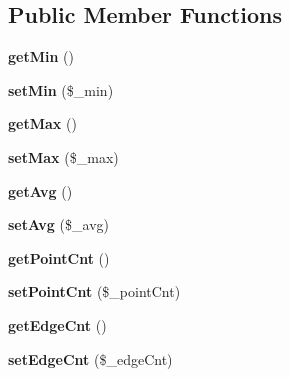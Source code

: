 \subsection*{Public Member Functions}
\begin{DoxyCompactItemize}
\item 
{\bfseries get\+Min} ()\hypertarget{class_reversi_anz_a8404d3eedbf6483ec27f13f64f9df3b1}{}\label{class_reversi_anz_a8404d3eedbf6483ec27f13f64f9df3b1}

\item 
{\bfseries set\+Min} (\$\+\_\+min)\hypertarget{class_reversi_anz_a6567c1122f96ec079b2f64f887e3543f}{}\label{class_reversi_anz_a6567c1122f96ec079b2f64f887e3543f}

\item 
{\bfseries get\+Max} ()\hypertarget{class_reversi_anz_abeb2912350107c52d5320b68beaceae7}{}\label{class_reversi_anz_abeb2912350107c52d5320b68beaceae7}

\item 
{\bfseries set\+Max} (\$\+\_\+max)\hypertarget{class_reversi_anz_a31a31b0d815ac3f3e26a67310269282a}{}\label{class_reversi_anz_a31a31b0d815ac3f3e26a67310269282a}

\item 
{\bfseries get\+Avg} ()\hypertarget{class_reversi_anz_a62d13c383b8902de0b1f1f76d4b3b4d9}{}\label{class_reversi_anz_a62d13c383b8902de0b1f1f76d4b3b4d9}

\item 
{\bfseries set\+Avg} (\$\+\_\+avg)\hypertarget{class_reversi_anz_a430a846117accd844d205cb8bbc4b1f1}{}\label{class_reversi_anz_a430a846117accd844d205cb8bbc4b1f1}

\item 
{\bfseries get\+Point\+Cnt} ()\hypertarget{class_reversi_anz_a86da928704556cffeb9eb19b1020beff}{}\label{class_reversi_anz_a86da928704556cffeb9eb19b1020beff}

\item 
{\bfseries set\+Point\+Cnt} (\$\+\_\+point\+Cnt)\hypertarget{class_reversi_anz_aa9f4140eed7e8d282ddf617def3c3c70}{}\label{class_reversi_anz_aa9f4140eed7e8d282ddf617def3c3c70}

\item 
{\bfseries get\+Edge\+Cnt} ()\hypertarget{class_reversi_anz_ac54bb2c81080ef8d6ae1ce1cf0f108bd}{}\label{class_reversi_anz_ac54bb2c81080ef8d6ae1ce1cf0f108bd}

\item 
{\bfseries set\+Edge\+Cnt} (\$\+\_\+edge\+Cnt)\hypertarget{class_reversi_anz_a83947131d9c16ac8d0368234fbc273d7}{}\label{class_reversi_anz_a83947131d9c16ac8d0368234fbc273d7}


\end{DoxyCompactItemize}
